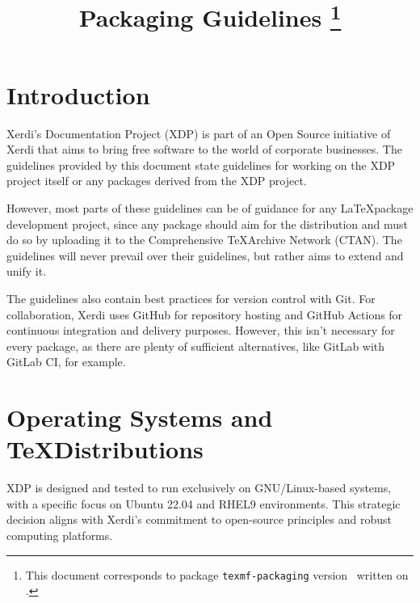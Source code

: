 \documentclass{xdpdoc}
\title{Packaging Guidelines%
\thanks{This document corresponds to package \texttt{texmf-packaging} version \gitversion\ written on \gitdate.}%
}
\begin{document}
    \maketitle

    \begin{multicols}{2}
        \section*{Introduction}
        Xerdi's Documentation Project (XDP) is part of an Open Source initiative of Xerdi that aims to bring free software to the world of corporate businesses.
        The guidelines provided by this document state guidelines for working on the XDP project itself or any packages derived from the XDP project.

        However, most parts of these guidelines can be of guidance for any \LaTeX package development project, since any package should aim for the \TeXLive distribution and must do so by uploading it to the Comprehensive \TeX Archive Network (CTAN).
        The guidelines will never prevail over their guidelines, but rather aims to extend and unify it.

        The guidelines also contain best practices for version control with Git.
        For collaboration, Xerdi uses GitHub for repository hosting and GitHub Actions for continuous integration and delivery purposes.
        However, this isn't necessary for every package, as there are plenty of sufficient alternatives, like GitLab with GitLab CI, for example.


        \section{Operating Systems and \TeX Distributions}
        XDP is designed and tested to run exclusively on GNU/Linux-based systems, with a specific focus on Ubuntu 22.04 and RHEL9 environments.
        This strategic decision aligns with Xerdi's commitment to open-source principles and robust computing platforms.


\end{multicols}
\end{document}

